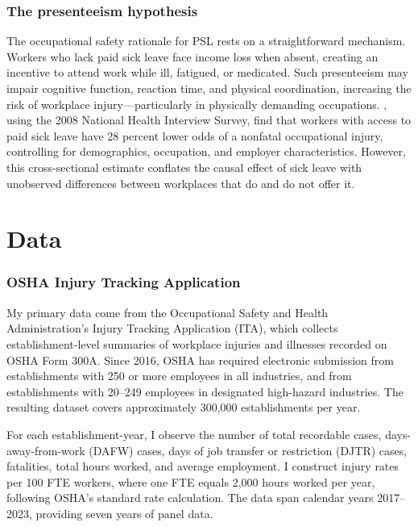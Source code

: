 \documentclass[12pt]{article}
\begin{document}
\subsubsection*{The presenteeism hypothesis} The occupational safety rationale for PSL rests on a straightforward mechanism. Workers who lack paid sick leave face income loss when absent, creating an incentive to attend work while ill, fatigued, or medicated. Such presenteeism may impair cognitive function, reaction time, and physical coordination, increasing the risk of workplace injury---particularly in physically demanding occupations. \citet{asfaw2012}, using the 2008 National Health Interview Survey, find that workers with access to paid sick leave have 28 percent lower odds of a nonfatal occupational injury, controlling for demographics, occupation, and employer characteristics. However, this cross-sectional estimate conflates the causal effect of sick leave with unobserved differences between workplaces that do and do not offer it.


\section{Data}

\subsubsection*{OSHA Injury Tracking Application} My primary data come from the Occupational Safety and Health Administration's Injury Tracking Application (ITA), which collects establishment-level summaries of workplace injuries and illnesses recorded on OSHA Form 300A. Since 2016, OSHA has required electronic submission from establishments with 250 or more employees in all industries, and from establishments with 20--249 employees in designated high-hazard industries. The resulting dataset covers approximately 300,000 establishments per year.

For each establishment-year, I observe the number of total recordable cases, days-away-from-work (DAFW) cases, days of job transfer or restriction (DJTR) cases, fatalities, total hours worked, and average employment. I construct injury rates per 100 FTE workers, where one FTE equals 2,000 hours worked per year, following OSHA's standard rate calculation. The data span calendar years 2017--2023, providing seven years of panel data.
\end{document}
